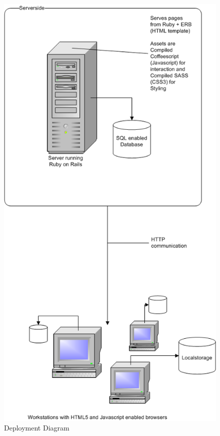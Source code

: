 \documentclass{report}
\begin{document}
				\begin{figure}[htb]
					\begin{center}
						\includegraphics[scale=0.95]{EAD.png}
						\caption{Deployment Diagram}
						\label{fig: EAD}
					\end{center}
				\end{figure}
				\clearpage
									
\end{document}
